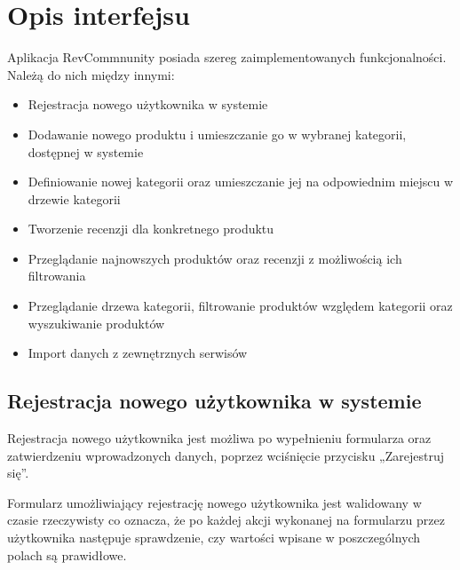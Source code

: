 \chapter{Opis interfejsu}

Aplikacja RevCommnunity posiada szereg zaimplementowanych funkcjonalności. Należą do nich między innymi:

\begin{itemize}
\item Rejestracja nowego użytkownika w systemie
\item Dodawanie nowego produktu i umieszczanie go w wybranej kategorii, dostępnej w systemie
\item Definiowanie nowej kategorii oraz umieszczanie jej na odpowiednim miejscu w drzewie kategorii
\item Tworzenie recenzji dla konkretnego produktu
\item Przeglądanie najnowszych produktów oraz recenzji z możliwością ich filtrowania
\item Przeglądanie drzewa kategorii, filtrowanie produktów względem kategorii oraz wyszukiwanie produktów
\item Import danych z zewnętrznych serwisów
\end{itemize}

\section{Rejestracja nowego użytkownika w systemie}

Rejestracja nowego użytkownika jest możliwa po wypełnieniu formularza oraz zatwierdzeniu wprowadzonych danych, poprzez wciśnięcie przycisku „Zarejestruj się”.

Formularz umożliwiający rejestrację nowego użytkownika jest walidowany w czasie rzeczywisty co oznacza, że po każdej akcji wykonanej na formularzu przez użytkownika następuje sprawdzenie, czy wartości wpisane w poszczególnych polach są prawidłowe.

